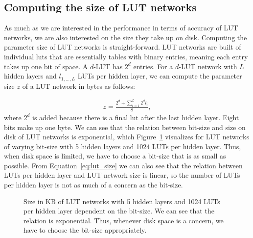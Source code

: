 \subsection{Computing the size of LUT networks} \label{sec:lut_network_size}
As much as we are interested in the performance in terms of accuracy of LUT networks, we are also interested on the size they take up on disk. Computing the parameter size of LUT networks is straight-forward. LUT networks are built of individual luts that are essentially tables with binary entries, meaning each entry takes up one bit of space. A $d$-LUT has $2^d$ entries. For a $d$-LUT network with $L$ hidden layers and $l_{1, \dots, L}$ LUTs per hidden layer, we can compute the parameter size $z$ of a LUT network in bytes as follows:

\begin{align} \label{eq:lut_size}
  z = \frac{2^d + \sum\limits_{i=1}^L 2^d l_i}{8},
\end{align}where $2^d$ is added because there is a final lut after the last hidden layer. Eight bits make up one byte. We can see that the relation between bit-size and size on disk of LUT networks is exponential, which Figure~\ref{fig:lut_size} visualizes for LUT networks of varying bit-size with 5 hidden layers and 1024 LUTs per hidden layer. Thus, when disk space is limited, we have to choose a bit-size that is as small as possible. From Equation~\ref{eq:lut_size} we can also see that the relation between LUTs per hidden layer and LUT network size is linear, so the number of LUTs per hidden layer is not as much of a concern as the bit-size.

\begin{figure}[!htb]
  \centering
  
  \caption{Size in KB of LUT networks with 5 hidden layers and 1024 LUTs per hidden layer dependent on the bit-size. We can see that the relation is exponential. Thus, whenever disk space is a concern, we have to choose the bit-size appropriately.}
\label{fig:lut_size}
\end{figure}
\FloatBarrier

